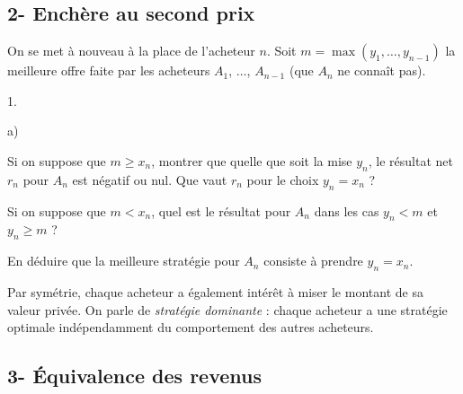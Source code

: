 


\subsection*{2- Enchère au second prix}

\noindent
On se met à nouveau à la place de l'acheteur $n$. Soit $m = \max(y_1, 
\ldots, y_{n-1})$ la meilleure offre faite par les acheteurs $A_1$, 
$\ldots$, $A_{n-1}$ (que $A_n$ ne connaît pas).
\begin{noliste}{1.}
  \setlength{\itemsep}{4mm}
  \setcounter{enumi}{11}
  \item \begin{noliste}{a)}
    \setlength{\itemsep}{2mm}
    \item Si on suppose que $m \geq x_n$, montrer que quelle que soit la
    mise $y_n$, le résultat net $r_n$ pour $A_n$ est négatif ou nul. 
    Que vaut $r_n$ pour le choix $y_n = x_n$ ?
    
    

    
    \item Si on suppose que $m < x_n$, quel est le résultat pour $A_n$
    dans les cas $y_n < m$ et $y_n \geq m$ ?
    
    

    
    
    
    \item En déduire que la meilleure stratégie pour $A_n$ consiste 
    à prendre $y_n =x_n$.
    
    
  \end{noliste}
\end{noliste}
Par symétrie, chaque acheteur a également intérêt à miser le montant de 
sa valeur privée. On parle de \emph{stratégie dominante} : chaque 
acheteur a une stratégie optimale indépendamment du comportement des 
autres acheteurs.




\subsection*{3- Équivalence des revenus}


